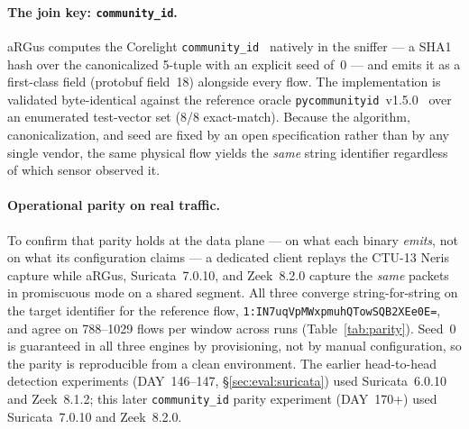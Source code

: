 \documentclass[11pt,a4paper]{article}
\begin{document}
    \paragraph{The join key: \texttt{community\_id}.}
    aRGus computes the Corelight \texttt{community\_id}~\cite{corelight2020communityid}
    natively in the sniffer --- a SHA1 hash over the canonicalized 5-tuple with an
    explicit seed of~0 --- and emits it as a first-class field (protobuf field~18)
    alongside every flow. The implementation is validated byte-identical against the
    reference oracle \texttt{pycommunityid}~v1.5.0~\cite{communityid_pyspec} over an
    enumerated test-vector set (8/8 exact-match). Because the algorithm, canonicalization,
    and seed are fixed by an open specification rather than by any single vendor, the same
    physical flow yields the \emph{same} string identifier regardless of which sensor
    observed it.

    \paragraph{Operational parity on real traffic.}
    To confirm that parity holds at the data plane --- on what each binary \emph{emits},
    not on what its configuration claims --- a dedicated client replays the CTU-13 Neris
    capture while aRGus, Suricata~7.0.10, and Zeek~8.2.0 capture the \emph{same} packets
    in promiscuous mode on a shared segment. All three converge string-for-string on the
    target identifier for the reference flow, \texttt{1:IN7uqVpMWxpmuhQTowSQB2XEe0E=}, and
    agree on 788--1029 flows per window across runs (Table~\ref{tab:parity}). Seed~0 is
    guaranteed in all three engines by provisioning, not by manual configuration, so the
    parity is reproducible from a clean environment. The earlier head-to-head detection
    experiments (DAY~146--147, \S\ref{sec:eval:suricata}) used Suricata~6.0.10 and Zeek~8.1.2;
    this later \texttt{community\_id} parity experiment (DAY~170+) used Suricata~7.0.10 and
    Zeek~8.2.0.
\end{document}
